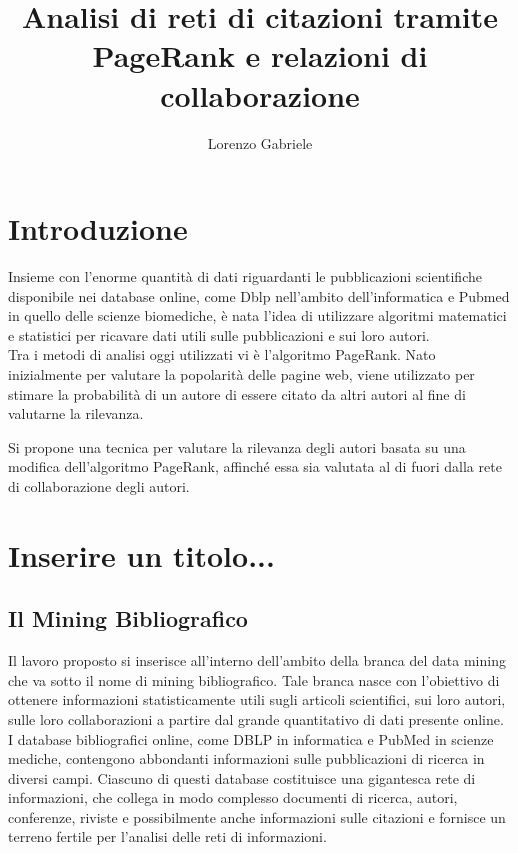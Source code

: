 \documentclass[a4paper, 12pt]{article}
\title{Analisi di reti di citazioni tramite PageRank e relazioni di collaborazione}
\author{Lorenzo Gabriele}
\let\oldsection\section
\renewcommand\section{\clearpage\oldsection}
\begin{document}
\maketitle
\clearpage
\tableofcontents
\clearpage

\section{Introduzione}
Insieme con l'enorme quantità di dati riguardanti le pubblicazioni scientifiche disponibile nei database online, come Dblp nell'ambito dell'informatica e Pubmed in quello delle scienze biomediche, è nata l'idea di utilizzare algoritmi matematici e statistici per ricavare dati utili sulle pubblicazioni e sui loro autori. \\
Tra i metodi di analisi oggi utilizzati vi è l'algoritmo PageRank. Nato inizialmente per valutare la popolarità delle pagine web, viene utilizzato per stimare la probabilità di un autore di essere citato da altri autori al fine di valutarne la rilevanza.
\par Si propone una tecnica per valutare la rilevanza degli autori basata su una modifica dell'algoritmo PageRank, affinché essa sia valutata al di fuori dalla rete di collaborazione degli autori.

\section{Inserire un titolo...}
\subsection{Il Mining Bibliografico}
Il lavoro proposto si inserisce all'interno dell'ambito della branca del data mining che va sotto il nome di mining bibliografico. Tale branca nasce con l'obiettivo di ottenere informazioni statisticamente utili sugli articoli scientifici, sui loro autori, sulle loro collaborazioni a partire dal grande quantitativo di dati presente online. \\
I database bibliografici online, come DBLP in informatica e PubMed in scienze mediche, contengono abbondanti informazioni sulle pubblicazioni di ricerca in diversi campi. Ciascuno di questi database costituisce una gigantesca rete di informazioni, che collega in modo complesso documenti di ricerca, autori, conferenze, riviste e possibilmente anche informazioni sulle citazioni e fornisce un terreno fertile per l'analisi delle reti di informazioni.
\end{document}
